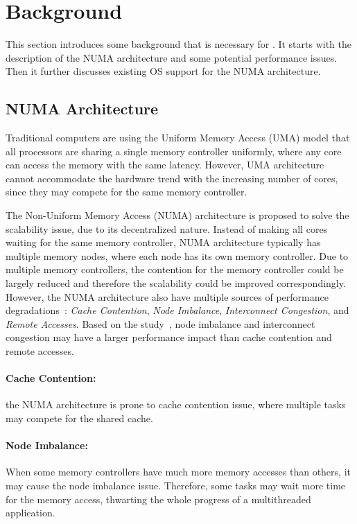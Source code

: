\section{Background}
\label{sec:overview}

This section introduces some background that is necessary for \NM{}. It starts with the description of the NUMA architecture and some potential performance issues. Then it further discusses existing OS support for the NUMA architecture.  

\subsection{NUMA Architecture}

\label{sec:numa}

Traditional computers are using the Uniform Memory Access (UMA) model that all processors are sharing a single memory controller uniformly, where any core can access the memory with the same latency. However, UMA architecture cannot accommodate the hardware trend with the increasing number of cores, since they may compete for the same memory controller.

The Non-Uniform Memory Access (NUMA) architecture is proposed to solve the scalability issue, due to its decentralized nature. Instead of making all cores waiting for the same memory controller, NUMA architecture typically has multiple memory nodes, where each node has its own memory controller. Due to multiple memory controllers, the contention for the memory controller could be largely reduced and therefore the scalability could be improved correspondingly. However, the NUMA architecture  also have multiple sources of performance degradations~\cite{Blagodurov:2011:CNC:2002181.2002182}: \textit{Cache Contention}, \textit{Node Imbalance}, \textit{Interconnect Congestion}, and \textit{Remote Accesses}. Based on the study~\cite{Blagodurov:2011:CNC:2002181.2002182}, node imbalance and interconnect congestion may have a larger performance impact than cache contention and remote accesses. 

\paragraph{Cache Contention:} the NUMA architecture is prone to cache contention issue, where multiple tasks may compete for the shared cache. 
 
\paragraph{Node Imbalance:} When some memory controllers have much more memory accesses than others, it may cause the node imbalance issue. Therefore, some tasks may wait more time for the memory access, thwarting the whole progress of a multithreaded application.  

